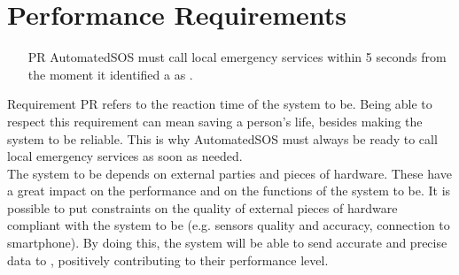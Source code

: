 \documentclass[../../rasd.tex]{subfiles}
\begin{document}
\section{Performance Requirements}
\begin{itemize}
	\item[PR\subs{1}]AutomatedSOS must call local emergency services within 5 seconds from the moment it identified a  as .
\end{itemize}

Requirement PR refers to the reaction time of the system to be. Being able to respect this requirement can mean saving a person's life, besides making the system to be reliable. This is why AutomatedSOS must always be ready to call local emergency services as soon as needed.\\

The system to be depends on external parties and pieces of hardware. These have a great impact on the performance and on the functions of the system to be. It is possible to put constraints on the quality of external pieces of hardware compliant with the system to be (e.g. sensors quality and accuracy,  connection to smartphone). By doing this, the system will be able to send accurate and precise data to , positively contributing to their performance level.
\end{document}
